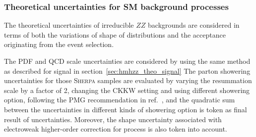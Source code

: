 %
%


\subsubsection{Theoretical uncertainties for SM background processes}

The theoretical uncertainties of irreducible $ZZ$ backgrounds are considered in terms of both the variations of shape of \mfl distributions
and the acceptance originating from the event selection.

The PDF and QCD scale uncertainties are considered by using the same method as described for signal in section~\ref{sec:hmhzz_theo_signal}
The parton showering uncertainties for those \textsc{Sherpa} samples are evaluated by varying the resummation scale by a factor of 2, 
changing the CKKW setting and using different showering option, following the PMG recommendation in ref.~\cite{twiki_pmgsyst},
and the quadratic sum between the uncertainties in different kinds of showering option is token as final result of uncertainties.
Moreover, the shape uncertainty associated with electroweak higher-order correction for \qqZZ process is also token into account.

